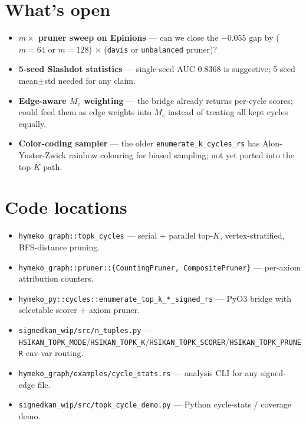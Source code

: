 \documentclass[11pt,a4paper]{article}
\newcommand{\code}[1]{\texttt{\small #1}}
\begin{document}
\section{What's open}

\begin{itemize}
\item \textbf{$m \times$ pruner sweep on Epinions} --- can we close
      the $-0.055$ gap by ($m{=}64$ or $m{=}128$) $\times$
      (\code{davis} or \code{unbalanced} pruner)?
\item \textbf{5-seed Slashdot statistics} --- single-seed AUC
      0.8368 is suggestive; 5-seed mean$\pm$std needed for any
      claim.
\item \textbf{Edge-aware $M_e$ weighting} --- the bridge already
      returns per-cycle scores; could feed them as edge weights
      into $M_e$ instead of treating all kept cycles equally.
\item \textbf{Color-coding sampler} --- the older
      \code{enumerate\_k\_cycles\_rs} has Alon-Yuster-Zwick rainbow
      colouring for biased sampling; not yet ported into the top-$K$
      path.
\end{itemize}

\section*{Code locations}

\begin{itemize}
\item \code{hymeko\_graph::topk\_cycles} --- serial + parallel
      top-$K$, vertex-stratified, BFS-distance pruning.
\item \code{hymeko\_graph::pruner::\{CountingPruner, CompositePruner\}}
      --- per-axiom attribution counters.
\item \code{hymeko\_py::cycles::enumerate\_top\_k\_*\_signed\_rs}
      --- PyO3 bridge with selectable scorer + axiom pruner.
\item \code{signedkan\_wip/src/n\_tuples.py} ---
      \code{HSIKAN\_TOPK\_MODE}/\code{HSIKAN\_TOPK\_K}/\code{HSIKAN\_TOPK\_SCORER}/\code{HSIKAN\_TOPK\_PRUNER} env-var routing.
\item \code{hymeko\_graph/examples/cycle\_stats.rs} --- analysis CLI
      for any signed-edge file.
\item \code{signedkan\_wip/src/topk\_cycle\_demo.py} --- Python
      cycle-stats / coverage demo.
\end{itemize}
\end{document}
